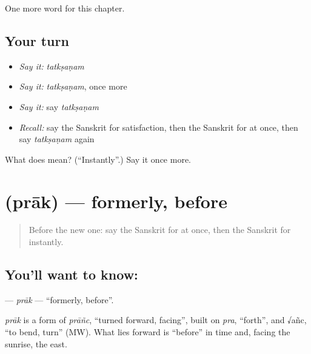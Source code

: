 \begin{grammarlens}[title={What you've built}]
One more word for this chapter.
\end{grammarlens}

\subsection*{Your turn}
\begin{itemize}
\raggedright
  \item \emph{Say it:} \emph{tatkṣaṇam}
  \item \emph{Say it:} \emph{tatkṣaṇam}, once more
  \item \emph{Say it:} say \emph{tatkṣaṇam}
  \item \emph{Recall:} say the Sanskrit for satisfaction, then the Sanskrit for at once, then say \emph{tatkṣaṇam} again
\end{itemize}

\begin{tcolorbox}[breakable,colback=teal!4,colframe=teal!35!black,title={Before you move on}]
What does  mean? (\textquotedblleft{}Instantly\textquotedblright{}.) Say it once more.
\end{tcolorbox}
\section[\texorpdfstring{\sk{प्राक्} (prāk)}{प्राक् (prāk)}]{ (prāk) — formerly, before}

\label{lesson:SA-C213-prak}



\begin{quote}
Before the new one: say the Sanskrit for at once, then the Sanskrit for instantly.
\end{quote}

\subsection*{You'll want to know: }
\textbf{} — \emph{prāk} — \textquotedblleft{}formerly, before\textquotedblright{}.

\begin{cousinweb}
\emph{prāk} is a form of \emph{prāñc}, \textquotedblleft{}turned forward, facing\textquotedblright{}, built on \emph{pra}, \textquotedblleft{}forth\textquotedblright{}, and √añc, \textquotedblleft{}to bend, turn\textquotedblright{} (MW). What lies forward is \textquotedblleft{}before\textquotedblright{} in time and, facing the sunrise, the east.
\end{cousinweb}


